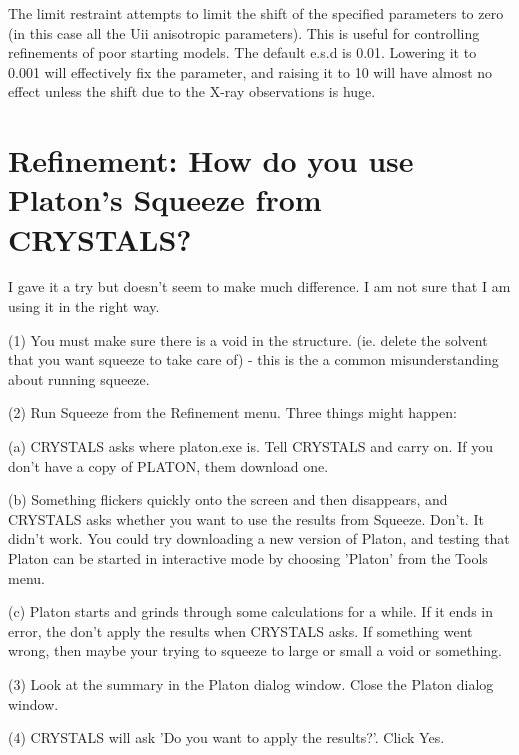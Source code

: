 \documentclass[10pt,a4paper]{report}
\begin{document}
 The limit restraint attempts to limit the shift of the specified
parameters to zero (in this case all the Uii anisotropic
parameters). This is useful for controlling refinements of poor
starting models. The default e.s.d is 0.01. Lowering it to 0.001
will effectively fix the parameter, and raising it to 10 will have
almost no effect unless the shift due to the X-ray observations is
huge.

\section{Refinement: How do you use Platon's Squeeze from CRYSTALS?}



I gave it a try but doesn't seem to make much difference. I am not 
sure that I am using it in the right way.



(1) You must make sure there is a void in the structure. (ie. delete the
solvent that you want squeeze to take care of) - this is the a
common misunderstanding about running squeeze.



(2) Run Squeeze from the Refinement menu. Three things might happen:



  (a) CRYSTALS asks where platon.exe is. Tell CRYSTALS and carry on.
If you don't have a copy of PLATON, them download one.



  (b) Something flickers quickly onto the screen and then disappears,
      and CRYSTALS asks whether you want to use the results from 
      Squeeze. Don't. It didn't work. You could try downloading a 
      new version of Platon, and testing that Platon can be
      started in interactive mode by choosing 'Platon' from the
      Tools menu.



  (c) Platon starts and grinds through some calculations for a while. If 
      it ends in error, the don't apply the results when CRYSTALS asks.
      If something went wrong, then maybe your trying to squeeze to 
      large or small a void or something.



(3) Look at the summary in the Platon dialog window. Close the Platon
    dialog window.



(4) CRYSTALS will ask 'Do you want to apply the results?'. Click Yes.
\end{document}

